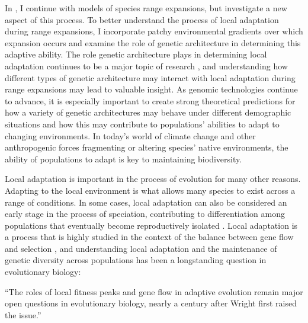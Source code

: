 In , I continue with models of species range expansions, but investigate a new aspect of this process. To better understand the process of local adaptation during range expansions, I incorporate patchy environmental gradients over which expansion occurs and examine the role of genetic architecture in determining this adaptive ability. The role genetic architecture plays in determining local adaptation continues to be a major topic of research \citep{Holt:2003, Yeaman:2015, Yeaman:2011, Carroll:2001, Holloway:1990, Peichel:2001, Bratteler:2006, Schiffers:2014}, and understanding how different types of genetic architecture may interact with local adaptation during range expansions may lead to valuable insight. As genomic technologies continue to advance, it is especially important to create strong theoretical predictions for how a variety of genetic architectures may behave under different demographic situations and how this may contribute to populations' abilities to adapt to changing environments. In today's world of climate change and other anthropogenic forces fragmenting or altering species' native environments, the ability of populations to adapt is key to maintaining biodiversity. %

Local adaptation is important in the process of evolution for many other reasons. Adapting to the local environment is what allows many species to exist across a range of conditions. In some cases, local adaptation can also be considered an early stage in the process of speciation, contributing to differentiation among populations that eventually become reproductively isolated \citep{Via:2012, Kirkpatrick:2006}. Local adaptation is a process that is highly studied in the context of the balance between gene flow and selection \citep{Kawecki:2004}, and understanding local adaptation and the maintenance of genetic diversity across populations has been a longstanding question in evolutionary biology:
\begin{quoteshrink}
  ``The roles of local fitness peaks and gene flow in adaptive evolution remain major open questions in evolutionary biology, nearly a century after Wright first raised the issue.''
  \hfill\citet{Barton:2016}
\end{quoteshrink}

